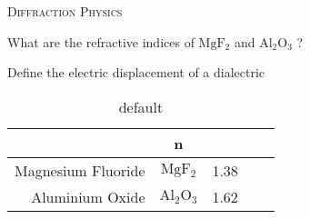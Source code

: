 \documentclass{article}
\newenvironment{flashcard}[2][]{%
\noindent   \textsc{#1}
\vfill
\centerline{{\noindent  \Large{#2}}}
\vfill
\newpage
\noindent  
}
{\newpage}
\begin{document}

\begin{flashcard}[Diffraction Physics]{What are the refractive indices of $\mathrm{Mg F_{2}}$ and $\mathrm{Al_{2}O_{3}}$ ?}
Define the electric displacement of a dialectric

\begin{table}[htdp]
\caption{default}
\begin{tabular}{| r | c | r | c | r |}
 & n  \\
\hline
Magnesium Fluoride & $\mathrm{Mg F_{2}}$ & 1.38 \\
Aluminium Oxide & $\mathrm{Al_{2}O_{3}}$ & 1.62 \\
\hline

\end{tabular}
\label{default}
\end{table}%


\end{flashcard}
\end{document}
